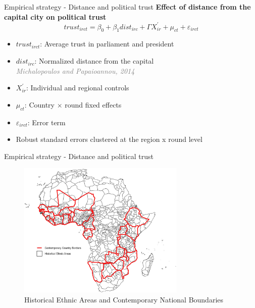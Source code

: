 \documentclass[10pt]{beamer}
\begin{document}
\begin{frame}{Empirical strategy - Distance and political trust}
    \centering \textbf{Effect of distance from the capital city on political trust}\vspace{1em}
        \begin{equation}
        trust_{irct} = \beta_{0} + \beta_{1}dist_{irc} + \Gamma X^{'}_{ir} + \mu_{ct} + \varepsilon_{irct}
        \end{equation}
        \begin{itemize}\setlength\itemsep{1em}

            \item $trust_{irct}$: Average trust in parliament and president \vfill
            \item $dist_{irc}$: Normalized distance from the capital \\
            \textcolor{gray}{\textit{Michalopoulos and Papaioannou, 2014}}\vfill
            \item $X^{'}_{ir}$: Individual and regional controls\vfill
            \item $\mu_{ct}$: Country $\times$ round fixed effects\vfill
            \item $\varepsilon_{irct}$: Error term\vfill
            \item Robust standard errors clustered at the region x round level
        \end{itemize}
\end{frame}

\begin{frame}{Empirical strategy - Distance and political trust}
    \begin{figure}
        \centering
        \caption{Historical Ethnic Areas and Contemporary National Boundaries}
        \includegraphics[width=8cm]{murdock_map.jpg}
    \end{figure}
    
\end{frame}
\end{document}
